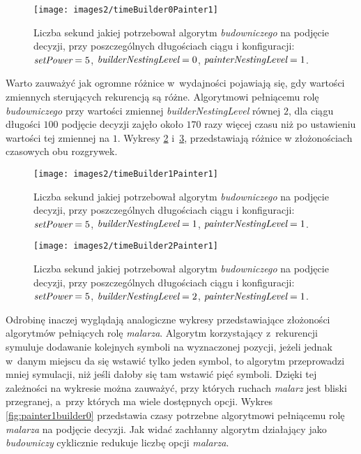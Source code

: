 \documentclass[document]{xmgr}
\begin{document}
\begin{figure}[tbh]
    \centering
    \caption{Liczba sekund jakiej potrzebował algorytm \emph{budowniczego} na podjęcie decyzji, przy poszczególnych długościach ciągu i konfiguracji: $\emph{setPower}=5$, $\emph{builderNestingLevel}=0$, $\emph{painterNestingLevel}=1$.}
    \texttt{[image: images2/timeBuilder0Painter1]}
    \label{fig:builder0painter1}
\end{figure}

Warto zauważyć jak ogromne różnice w~wydajności pojawiają się, gdy wartości zmiennych sterujących rekurencją są różne. Algorytmowi pełniącemu rolę \emph{budowniczego} przy wartości zmiennej \emph{builderNestingLevel} równej $2$, dla ciągu długości $100$ podjęcie decyzji zajęło około $170$ razy więcej czasu niż po ustawieniu wartości tej zmiennej na $1$. Wykresy \ref{fig:builder1painter1} i~\ref{fig:builder2painter1}, przedstawiają różnice w złożonościach czasowych obu rozgrywek.

\begin{figure}[tbh]
    \centering
    \caption{Liczba sekund jakiej potrzebował algorytm \emph{budowniczego} na podjęcie decyzji, przy poszczególnych długościach ciągu i konfiguracji: $\emph{setPower}=5$, $\emph{builderNestingLevel}=1$, $\emph{painterNestingLevel}=1$.}
    \texttt{[image: images2/timeBuilder1Painter1]}
    \label{fig:builder1painter1}
\end{figure}

\begin{figure}[tbh]
    \centering
    \caption{Liczba sekund jakiej potrzebował algorytm \emph{budowniczego} na podjęcie decyzji, przy poszczególnych długościach ciągu i konfiguracji: $\emph{setPower}=5$, $\emph{builderNestingLevel}=2$, $\emph{painterNestingLevel}=1$.}
    \texttt{[image: images2/timeBuilder2Painter1]}
    \label{fig:builder2painter1}
\end{figure}

Odrobinę inaczej wyglądają analogiczne wykresy przedstawiające złożoności algorytmów pełniących rolę \emph{malarza}. Algorytm korzystający z~rekurencji symuluje dodawanie kolejnych symboli na wyznaczonej pozycji, jeżeli jednak w~danym miejscu da się wstawić tylko jeden symbol, to algorytm przeprowadzi mniej symulacji, niż jeśli dałoby się tam wstawić pięć symboli. Dzięki tej zależności na wykresie można zauważyć, przy których ruchach \emph{malarz} jest bliski przegranej, a~przy których ma wiele dostępnych opcji. Wykres \ref{fig:painter1builder0} przedstawia czasy potrzebne algorytmowi pełniącemu rolę \emph{malarza} na podjęcie decyzji. Jak widać zachłanny algorytm działający jako \emph{budowniczy} cyklicznie redukuje liczbę opcji \emph{malarza}.
\end{document}
